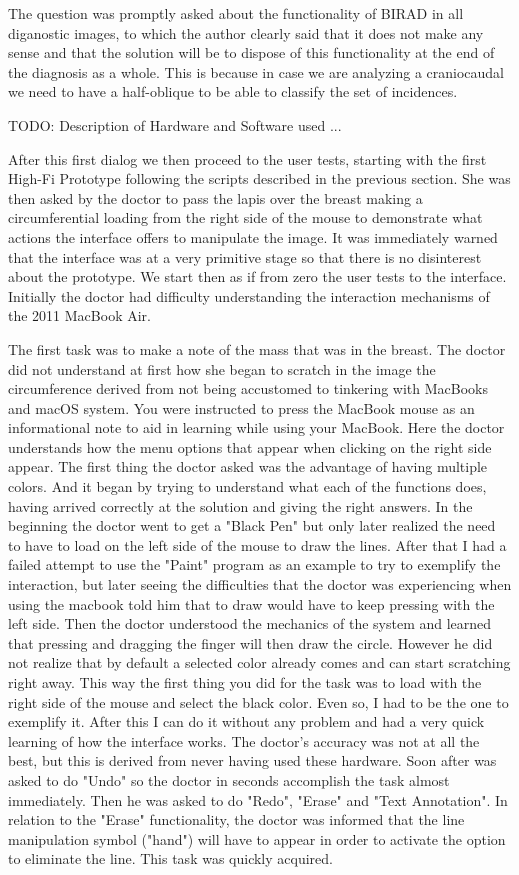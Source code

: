The question was promptly asked about the functionality of BIRAD in all diganostic images, to which the author clearly said that it does not make any sense and that the solution will be to dispose of this functionality at the end of the diagnosis as a whole. This is because in case we are analyzing a craniocaudal we need to have a half-oblique to be able to classify the set of incidences.

TODO: Description of Hardware and Software used ...

After this first dialog we then proceed to the user tests, starting with the first High-Fi Prototype following the scripts described in the previous section. She was then asked by the doctor to pass the lapis over the breast making a circumferential loading from the right side of the mouse to demonstrate what actions the interface offers to manipulate the image. It was immediately warned that the interface was at a very primitive stage so that there is no disinterest about the prototype. We start then as if from zero the user tests to the interface. Initially the doctor had difficulty understanding the interaction mechanisms of the 2011 MacBook Air.

The first task was to make a note of the mass that was in the breast. The doctor did not understand at first how she began to scratch in the image the circumference derived from not being accustomed to tinkering with MacBooks and macOS system. You were instructed to press the MacBook mouse as an informational note to aid in learning while using your MacBook. Here the doctor understands how the menu options that appear when clicking on the right side appear. The first thing the doctor asked was the advantage of having multiple colors. And it began by trying to understand what each of the functions does, having arrived correctly at the solution and giving the right answers. In the beginning the doctor went to get a "Black Pen" but only later realized the need to have to load on the left side of the mouse to draw the lines. After that I had a failed attempt to use the "Paint" program as an example to try to exemplify the interaction, but later seeing the difficulties that the doctor was experiencing when using the macbook told him that to draw would have to keep pressing with the left side. Then the doctor understood the mechanics of the system and learned that pressing and dragging the finger will then draw the circle. However he did not realize that by default a selected color already comes and can start scratching right away. This way the first thing you did for the task was to load with the right side of the mouse and select the black color. Even so, I had to be the one to exemplify it. After this I can do it without any problem and had a very quick learning of how the interface works. The doctor's accuracy was not at all the best, but this is derived from never having used these hardware. Soon after was asked to do "Undo" so the doctor in seconds accomplish the task almost immediately. Then he was asked to do "Redo", "Erase" and "Text Annotation". In relation to the "Erase" functionality, the doctor was informed that the line manipulation symbol ("hand") will have to appear in order to activate the option to eliminate the line. This task was quickly acquired.

